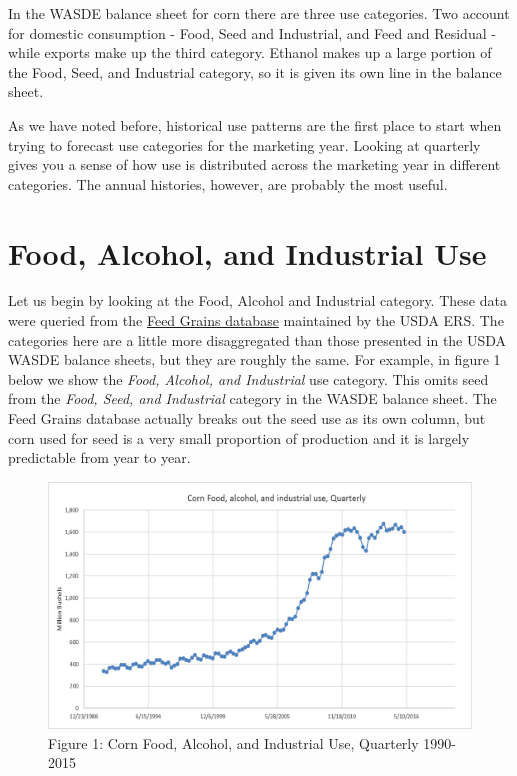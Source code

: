\documentclass[]{book}
\theoremstyle{definition}
\theoremstyle{definition}
\theoremstyle{remark}
\begin{document}
In the WASDE balance sheet for corn there are three use categories. Two
account for domestic consumption - Food, Seed and Industrial, and Feed
and Residual - while exports make up the third category. Ethanol makes
up a large portion of the Food, Seed, and Industrial category, so it is
given its own line in the balance sheet.

As we have noted before, historical use patterns are the first place to
start when trying to forecast use categories for the marketing year.
Looking at quarterly gives you a sense of how use is distributed across
the marketing year in different categories. The annual histories,
however, are probably the most useful.

\section{Food, Alcohol, and Industrial
Use}\label{food-alcohol-and-industrial-use}

Let us begin by looking at the Food, Alcohol and Industrial category.
These data were queried from the
\href{http://www.ers.usda.gov/data-products/feed-grains-database/feed-grains-yearbook-tables.aspx\#26780}{Feed
Grains database} maintained by the USDA ERS. The categories here are a
little more disaggregated than those presented in the USDA WASDE balance
sheets, but they are roughly the same. For example, in figure 1 below we
show the \emph{Food, Alcohol, and Industrial} use category. This omits
seed from the \emph{Food, Seed, and Industrial} category in the WASDE
balance sheet. The Feed Grains database actually breaks out the seed use
as its own column, but corn used for seed is a very small proportion of
production and it is largely predictable from year to year.

\begin{figure}[htbp]
\centering
\includegraphics{Excel-files/IntroductiontoCommodityTS-FeedGrains_Corn_files/image013.png}
\caption{Figure 1: Corn Food, Alcohol, and Industrial Use, Quarterly
1990-2015}
\end{figure}
\end{document}
